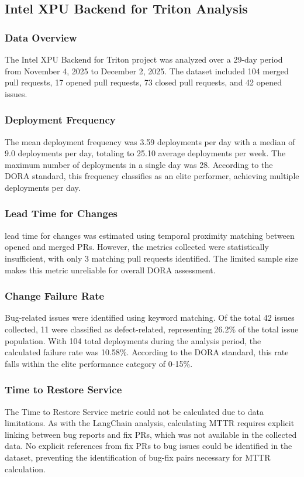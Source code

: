 \documentclass[12pt]{article}
\begin{document}
\subsection{Intel XPU Backend for Triton Analysis}

\subsubsection{Data Overview}
The Intel XPU Backend for Triton project was analyzed over a 29-day
period from November 4, 2025 to December 2, 2025. The dataset
included 104 merged pull requests, 17 opened pull requests, 73
closed pull requests, and 42 opened issues.

\subsubsection{Deployment Frequency}
The mean deployment frequency was 3.59 deployments per day with a median
of 9.0 deployments per day, totaling to 25.10 average deployments per week.
The maximum number of deployments in a single day was 28. According to the DORA
standard, this frequency classifies as an elite performer, achieving
multiple deployments
per day.

\subsubsection{Lead Time for Changes}
lead time for changes was estimated using temporal proximity matching
between opened and merged PRs. However, the metrics collected were
statistically insufficient, with only
3 matching pull requests identified. The limited sample size makes this metric
unreliable for overall DORA assessment.

\subsubsection{Change Failure Rate}
Bug-related issues were identified using keyword matching. Of the total
42 issues collected, 11 were classified as defect-related,
representing 26.2\% of the total
issue population. With 104 total deployments during the analysis
period, the calculated
failure rate was 10.58\%. According to the DORA standard, this rate
falls within the elite
performance category of 0-15\%.

\subsubsection{Time to Restore Service}
The Time to Restore Service metric could not be calculated due to
data limitations. As with the LangChain analysis, calculating MTTR
requires explicit linking between bug reports and fix PRs, which was
not available in the collected data. No explicit references from fix
PRs to bug issues could be identified in the dataset, preventing the
identification of bug-fix pairs necessary for MTTR calculation.
\end{document}
